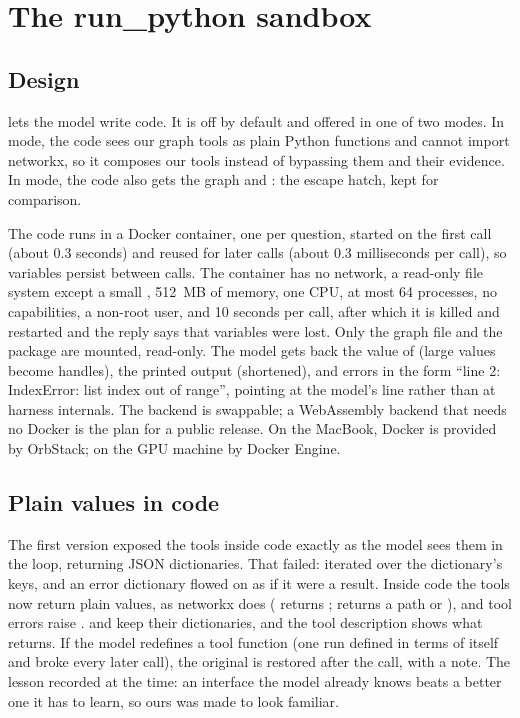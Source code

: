 \section{The run\_python sandbox}

\subsection{Design}

 lets the model write code. It is off by default and offered in one of two modes. In
 mode, the code sees our graph tools as plain Python functions and cannot import networkx, so it
composes our tools instead of bypassing them and their evidence. In  mode, the code also gets the
graph  and : the escape hatch, kept for comparison.

The code runs in a Docker container, one per question, started on the first call (about 0.3 seconds) and reused for
later calls (about 0.3 milliseconds per call), so variables persist between calls. The container has no network, a
read-only file system except a small , 512~MB of memory, one CPU, at most 64 processes, no capabilities, a
non-root user, and 10 seconds per call, after which it is killed and restarted and the reply says that variables were
lost. Only the graph file and the  package are mounted, read-only. The model gets back the value of
 (large values become handles), the printed output (shortened), and errors in the form ``line 2:
IndexError: list index out of range'', pointing at the model's line rather than at harness internals. The backend is
swappable; a WebAssembly backend that needs no Docker is the plan for a public release. On the MacBook, Docker is
provided by OrbStack; on the GPU machine by Docker Engine.

\subsection{Plain values in code}

The first version exposed the tools inside code exactly as the model sees them in the loop, returning JSON
dictionaries. That failed:  iterated over the dictionary's keys, and an error
dictionary flowed on as if it were a result. Inside code the tools now return plain values, as networkx does
( returns \code{[2, 5]};  returns a path or ), and tool
errors raise .  and  keep their dictionaries, and the tool
description shows what  returns. If the model redefines a tool function (one run defined
 in terms of itself and broke every later call), the original is restored after the call, with a
note. The lesson recorded at the time: an interface the model already knows beats a better one it has to learn, so
ours was made to look familiar.

